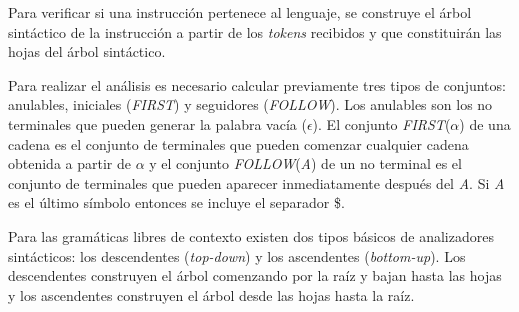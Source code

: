 Para verificar si una instrucción pertenece al lenguaje, se construye el árbol sintáctico de la instrucción a partir de los \textit{tokens} recibidos y que constituirán las hojas del árbol sintáctico. 


Para realizar el análisis es necesario calcular previamente tres tipos de conjuntos: anulables, iniciales (\textit{FIRST}) y seguidores (\textit{FOLLOW}). Los anulables son los no terminales que pueden generar la palabra vacía ($\epsilon$). El conjunto \textit{FIRST}($\alpha$) de una cadena es el conjunto de terminales que pueden comenzar cualquier cadena obtenida a partir de $\alpha$ y el conjunto \textit{FOLLOW}(\textit{A}) de un no terminal es el conjunto de terminales que pueden aparecer inmediatamente después del \textit{A}. Si \textit{A} es el último símbolo entonces se incluye el separador \$. 

Para las gramáticas libres de contexto existen dos tipos básicos de analizadores sintácticos: los descendentes (\textit{top-down}) y los ascendentes (\textit{bottom-up}). Los descendentes construyen el árbol comenzando por la raíz y bajan hasta las hojas y los ascendentes construyen el árbol desde las hojas hasta la raíz.


%

	
	
	
